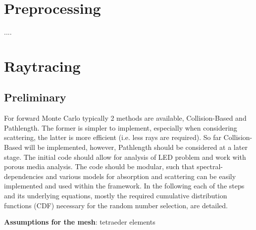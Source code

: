 \documentclass[a4paper,10pt]{scrartcl}
\begin{document}
\section{Preprocessing}
 ....
 
\section{Raytracing}

\subsection{Preliminary}
For forward Monte Carlo typically 2 methods are available, Collision-Based and Pathlength.
The former is simpler to implement, especially when considering scattering, the latter is more efficient (i.e. less rays are required).
So far Collision-Based will be implemented, however, Pathlength should be considered at a later stage.
The initial code should allow for analysis of LED problem and work with porous media analysis. 
The code should be modular, such that spectral-dependencies and various models for absorption and scattering can be easily implemented and used within the framework.
In the following each of the steps and its underlying equations, mostly the required cumulative distribution functions (CDF) necessary for the random number selection, are detailed.

\textbf{Assumptions for the mesh}: tetraeder elements
\end{document}
